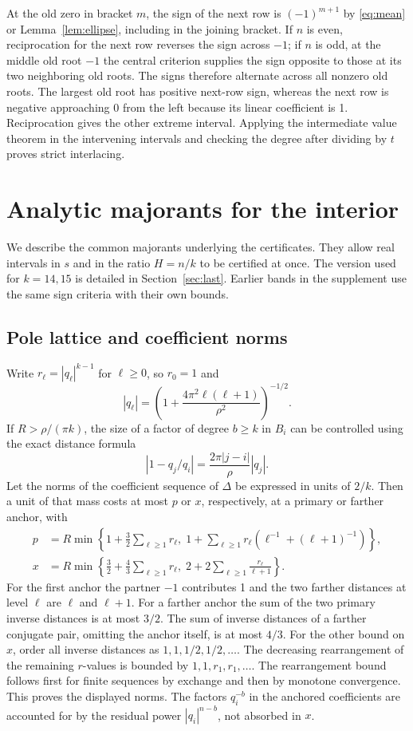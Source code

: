 \documentclass[11pt,reqno]{amsart}
\theoremstyle{remark}
\begin{document}
At the old zero in bracket $m$, the sign of the next row is $(-1)^{m+1}$ by \eqref{eq:mean} or Lemma~\ref{lem:ellipse}, including in the joining bracket. If $n$ is even, reciprocation for the next row reverses the sign across $-1$; if $n$ is odd, at the middle old root $-1$ the central criterion supplies the sign opposite to those at its two neighboring old roots. The signs therefore alternate across all nonzero old roots. The largest old root has positive next-row sign, whereas the next row is negative approaching $0$ from the left because its linear coefficient is 1. Reciprocation gives the other extreme interval. Applying the intermediate value theorem in the intervening intervals and checking the degree after dividing by $t$ proves strict interlacing.

\section{Analytic majorants for the interior}\label{sec:majorants}
We describe the common majorants underlying the certificates. They allow real intervals in $s$ and in the ratio $H=n/k$ to be certified at once. The version used for $k=14,15$ is detailed in Section~\ref{sec:last}. Earlier bands in the supplement use the same sign criteria with their own bounds.

\subsection{Pole lattice and coefficient norms}
Write $r_\ell=|q_\ell|^{k-1}$ for $\ell\ge0$, so $r_0=1$ and
\[
 |q_\ell|=\left(1+\frac{4\pi^2\ell(\ell+1)}{\rho^2}\right)^{-1/2}.
\]
If $R>\rho/(\pi k)$, the size of a factor of degree $b\ge k$ in $B_i$ can be controlled using the exact distance formula
\begin{equation}\label{eq:dist}
 |1-q_j/q_i|=\frac{2\pi|j-i|}{\rho}|q_j| .
\end{equation}
Let the norms of the coefficient sequence of $\Delta$ be expressed in units of $2/k$. Then a unit of that mass costs at most $p$ or $x$, respectively, at a primary or farther anchor, with
\begin{align*}
 p &=
 R\min\left\{1+\tfrac32\sum_{\ell\ge1}r_\ell,\;
   1+\sum_{\ell\ge1}r_\ell(\ell^{-1}+(\ell+1)^{-1})\right\},\\
 x &=
 R\min\left\{\tfrac32+\tfrac43\sum_{\ell\ge1}r_\ell,\;
   2+2\sum_{\ell\ge1}\frac{r_\ell}{\ell+1}\right\}.
\end{align*}
For the first anchor the partner $-1$ contributes 1 and the two farther distances at level $\ell$ are $\ell$ and $\ell+1$. For a farther anchor the sum of the two primary inverse distances is at most $3/2$. The sum of inverse distances of a farther conjugate pair, omitting the anchor itself, is at most $4/3$. For the other bound on $x$, order all inverse distances as $1,1,1/2,1/2,\ldots$. The decreasing rearrangement of the remaining $r$-values is bounded by $1,1,r_1,r_1,\ldots$. The rearrangement bound follows first for finite sequences by exchange and then by monotone convergence. This proves the displayed norms. The factors $q_i^{-b}$ in the anchored coefficients are accounted for by the residual power $|q_i|^{n-b}$, not absorbed in $x$.
\end{document}
